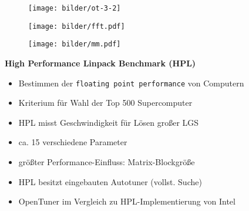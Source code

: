     \begingroup
  \begin{frame}
    \begin{figure}[ht]
      \centering	      
      \texttt{[image: bilder/ot-3-2]}
      \label{gccpy2}
    \end{figure}
  \end{frame}
  \endgroup

 \begingroup
  \begin{frame}
      \begin{figure}[ht]
      \centering	      
      \texttt{[image: bilder/fft.pdf]}
      \label{gccResults}
    \end{figure}
  \end{frame} 
  \endgroup
  
 \begingroup
  \begin{frame}
      \begin{figure}[ht]
      \centering	      
      \texttt{[image: bilder/mm.pdf]}
      \label{gccResults}
    \end{figure}
  \end{frame} 
  \endgroup
  
  
 \begingroup
\begin{frame}
  \textbf{High Performance Linpack Benchmark (HPL)}
  \begin{itemize}
    \item Bestimmen der \texttt{floating point performance} von Computern
    
    \item Kriterium für Wahl der Top 500 Supercomputer
    \item HPL misst Geschwindigkeit für Lösen großer LGS
    
    \item ca. 15 verschiedene Parameter
    
    \item größter Performance-Einfluss: Matrix-Blockgröße
   
    \item HPL besitzt eingebauten Autotuner (vollst. Suche)
        
    \item OpenTuner im Vergleich zu HPL-Implementierung von Intel
    
  \end{itemize}  
\end{frame}
\endgroup

